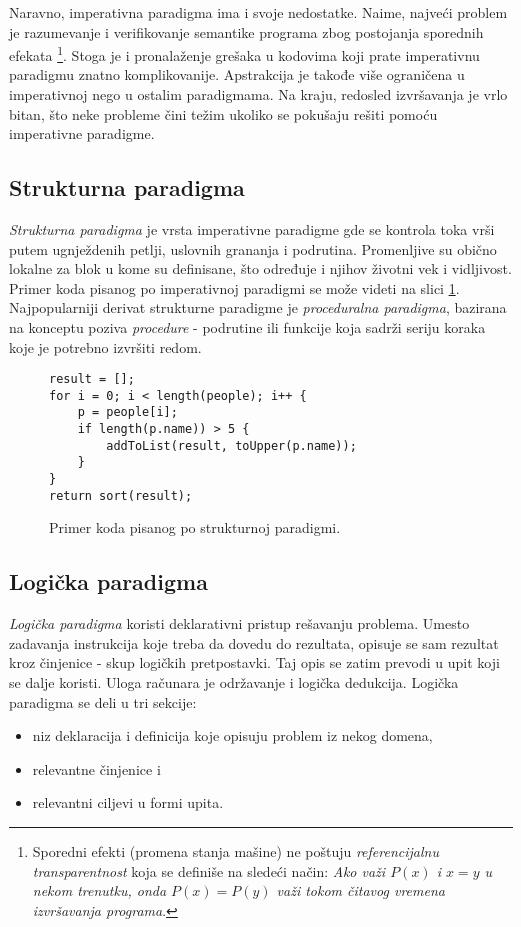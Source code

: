 Naravno, imperativna paradigma ima i svoje nedostatke. Naime, najveći problem je razumevanje i verifikovanje semantike programa zbog postojanja sporednih efekata \footnote{Sporedni efekti (promena stanja mašine) ne poštuju \emph{referencijalnu transparentnost} koja se definiše na sledeći način: \emph{Ako važi $P(x)$ i $x = y$ u nekom trenutku, onda $P(x) = P(y)$ važi tokom čitavog vremena izvršavanja programa}.}. Stoga je i pronalaženje grešaka u kodovima koji prate imperativnu paradigmu znatno komplikovanije. Apstrakcija je takođe više ograničena u imperativnoj nego u ostalim paradigmama. Na kraju, redosled izvršavanja je vrlo bitan, što neke probleme čini težim ukoliko se pokušaju rešiti pomoću imperativne paradigme.

\subsection{Strukturna paradigma}
\label{subsec:ParadigmImperativeStructural}

\emph{Strukturna paradigma} je vrsta imperativne paradigme gde se kontrola toka vrši putem ugnježdenih petlji, uslovnih grananja i podrutina. Promenljive su obično lokalne za blok u kome su definisane, što određuje i njihov životni vek i vidljivost. Primer koda pisanog po imperativnoj paradigmi se može videti na slici \ref{fig:ParadigmStructural}. Najpopularniji derivat strukturne paradigme je \emph{proceduralna paradigma}, bazirana na konceptu poziva \emph{procedure} - podrutine ili funkcije koja sadrži seriju koraka koje je potrebno izvršiti redom.

\begin{figure}[h!]
\begin{lstlisting}
result = [];
for i = 0; i < length(people); i++ {
    p = people[i];
    if length(p.name)) > 5 {
        addToList(result, toUpper(p.name));
    }
}
return sort(result);
\end{lstlisting}
\caption{Primer koda pisanog po strukturnoj paradigmi.}
\label{fig:ParadigmStructural}
\end{figure}


\subsection{Logička paradigma}
\label{subsec:ParadigmLogical}

\emph{Logička paradigma} koristi deklarativni pristup rešavanju problema. Umesto zadavanja instrukcija koje treba da dovedu do rezultata, opisuje se sam rezultat kroz činjenice - skup logičkih pretpostavki. Taj opis se zatim prevodi u upit koji se dalje koristi. Uloga računara je održavanje i logička dedukcija. Logička paradigma se deli u tri sekcije:
\begin{itemize}
    \item niz deklaracija i definicija koje opisuju problem iz nekog domena,
    \item relevantne činjenice i
    \item relevantni ciljevi u formi upita.
\end{itemize}

